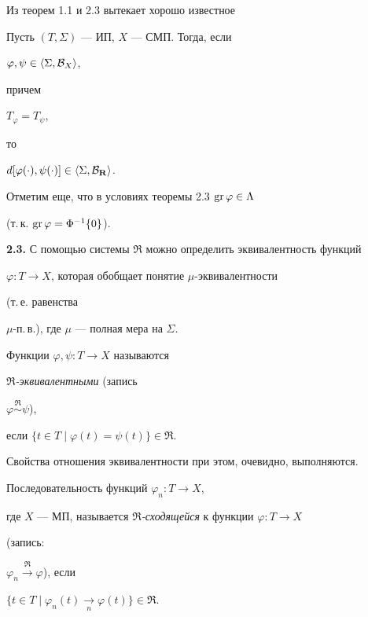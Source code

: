 Из теорем 1.1 и 2.3 вытекает хорошо известное





\begin{cors} Пусть $(T,\Sigma)$ --- ИП, $X$ --- СМП. Тогда, если


$\varphi,\psi\in\langle \Sigma ,{\cal B}_X\rangle $,


причем


$T_\varphi=T_\psi$,


то


$d[\varphi(\cdot),\psi(\cdot)]\in\langle \Sigma ,{\cal B}_{\bold R}\rangle $.


\end{cors}





Отметим еще, что в условиях теоремы 2.3 $\operatorname{gr}\varphi\in\Lambda$


(т.\,к. $\operatorname{gr}\varphi=\Phi^{-1}\{0\}$).





{\bf 2.3.} С помощью системы $\Re$ можно определить эквивалентность функций


$\varphi:T\to X$, которая обобщает понятие $\mu$-эквивалентности


(т.\,е. равенства


$\mu$-п.\,в.), где $\mu$ --- полная мера на $\Sigma$.





\begin{defns} Функции $\varphi ,\psi :T\to X$ называются


{\em $\Re$-эквивалентными} (запись


$\varphi\overset{\Re}{\sim}\psi$),


если $\{t\in T\mid \varphi(t)=\psi(t)\}\in\Re$.


\end{defns}





Свойства отношения эквивалентности при этом, очевидно, выполняются.





\begin{defns} Последовательность функций $\varphi_n :T\to X$,


где $X$ --- МП, называется {\em $\Re$-сходящейся} к функции $\varphi : T\to X$


(запись:


$\varphi_n\overset{\Re}{\longrightarrow}\varphi$), если


$\{t\in T\mid \varphi_n(t)\underset{n}{\longrightarrow}\varphi(t)\}\in\Re$.


\end{defns}





